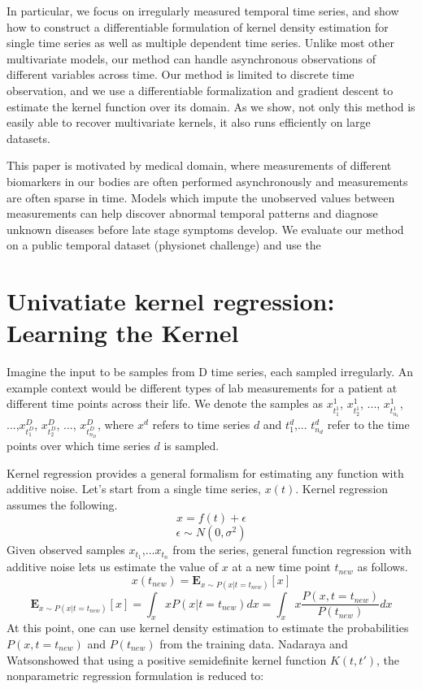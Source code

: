 \documentclass{article} %
\begin{document}
In particular, we focus on irregularly measured temporal time series, and show how to construct a differentiable formulation of kernel density estimation for single time series as well as multiple dependent time series. Unlike most other multivariate models, our method can handle asynchronous observations of different variables across time. Our method is limited to discrete time observation, and we use a differentiable formalization and gradient descent to estimate the kernel function over its domain. As we show, not only this method is easily able to recover multivariate kernels, it also runs efficiently on large datasets.  

This paper is motivated by medical domain, where measurements of different biomarkers in our bodies are often performed asynchronously and measurements are often sparse in time. Models which impute the unobserved values between measurements can help discover abnormal temporal patterns and diagnose unknown diseases before late stage symptoms develop. We evaluate our method on a public temporal dataset (physionet challenge) and use the 

\section{Univatiate kernel regression: Learning the Kernel}
Imagine the input to be samples from D time series, each sampled irregularly. An example context would be different types of lab measurements for a patient at different time points across their life. We denote the samples as ${x^1_{t^1_1}}$, ${x^1_{t^1_2}}$, ..., ${x^1_{t^1_{n_1}}}$, ...,${x^D_{t^D_1}}$, ${x^D_{t^D_2}}$, ..., ${x^D_{t^D_{n_D}}}$, where $x^d$ refers to time series $d$ and $t^d_1$,... $t^d_{n_d}$ refer to the time points over which time series $d$ is sampled. 

Kernel regression provides a general formalism for estimating any function with additive noise. Let's start from a single time series, $x(t)$. Kernel regression assumes the following.
% 
$$ x = f(t) + \epsilon $$
$$\epsilon \sim N(0,\sigma^2)$$
% 
Given observed samples $x_{t_1}$,...$x_{t_n}$ from the series, general function regression with additive noise lets us estimate the value of $x$ at a new time point $t_{new}$ as follows. 
% 
$$x(t_{new}) = \mathbf{E}_{x \sim P(x|t=t_{new})}[x] $$
$$\mathbf{E}_{x \sim P(x|t=t_{new})}[x] = \int_x x P(x|t=t_{new}) dx =\int_x x \frac{P(x , t=t_{new})}{P(t_{new})} dx $$
% 
At this point, one can use kernel density estimation to estimate the probabilities $P(x , t=t_{new})$ and $P(t_{new})$ from the training data. Nadaraya\cite{} and Watson\cite{}showed that using a positive semidefinite kernel function $K(t, t')$, the nonparametric regression formulation is reduced to:
\end{document}
